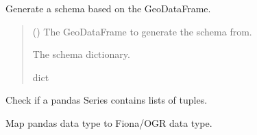 \documentclass[letterpaper,10pt,english]{sphinxmanual}
\begin{document}
\begin{fulllineitems}
\label{\detokenize{pysewer:pysewer.export.generate_schema}}
\pysigstartsignatures
{}
\pysigstopsignatures
\sphinxAtStartPar
Generate a schema based on the GeoDataFrame.
\begin{quote}\begin{description}
\sphinxAtStartPar
{} () \textendash{} The GeoDataFrame to generate the schema from.

\sphinxAtStartPar
The schema dictionary.

\sphinxAtStartPar
dict

\end{description}\end{quote}

\end{fulllineitems}


\begin{fulllineitems}
\label{\detokenize{pysewer:pysewer.export.is_list_of_tuples}}
\pysigstartsignatures
{}
\pysigstopsignatures
\sphinxAtStartPar
Check if a pandas Series contains lists of tuples.

\end{fulllineitems}


\begin{fulllineitems}
\label{\detokenize{pysewer:pysewer.export.map_dtype_to_fiona}}
\pysigstartsignatures
{}
\pysigstopsignatures
\sphinxAtStartPar
Map pandas data type to Fiona/OGR data type.

\end{fulllineitems}
\end{document}
